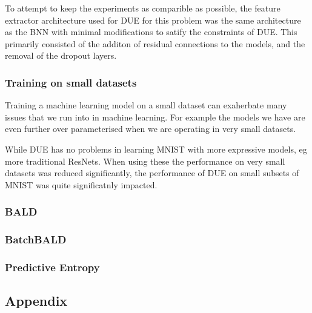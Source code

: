 \documentclass[12pt, a4paper]{report}
\theoremstyle{definition}
\begin{document}
To attempt to keep the experiments as comparible as possible, the feature extractor architecture used for DUE for this problem was the same architecture as the BNN with minimal modifications to satify the constraints of DUE. This primarily consisted of the additon of residual connections to the models, and the removal of the dropout layers.


\subsection{Training on small datasets}

Training a machine learning model on a small dataset can exaherbate many issues that we run into in machine learning. For example the models we have are even further over parameterised when we are operating in very small datasets.

While DUE has no problems in learning MNIST with more expressive models, eg more traditional ResNets. When using these the performance on very small datasets was reduced significantly, the performance of DUE on small subsets of MNIST was quite significatnly impacted.


\subsection{BALD}

\subsection{BatchBALD}

\subsection{Predictive Entropy}






\renewcommand{\bibname}{Bibliography}



\begin{appendices}
\chapter{Appendix}

\end{appendices}
\end{document}
